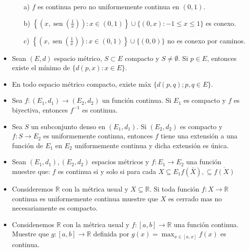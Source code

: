 \begin{itemize}
\begin{itemize}
    \item[a)] $f$ es continua pero no uniformemente continua en $(0,1)$.
    
    \item[b)] $\left\{\left(x, \operatorname{sen}\left(\frac{1}{x}\right)\right): x \in(0,1)\right\} \cup\{(0, x):-1 \leq x \leq 1\}$ es conexo.
    
    \item[c)] $\left\{\left(x, \operatorname{sen}\left(\frac{1}{x}\right)\right): x \in(0,1)\right\} \cup\{(0,0)\}$ no es conexo por caminos.

\end{itemize}

\item Sean $(E, d)$ espacio métrico, $S \subset E$ compacto y $S \neq \emptyset$. Si $p \in E$, entonces existe el mínimo de $\{d(p, x): x \in E\}$.

\item En todo espacio métrico compacto, existe máx $\{d(p, q) ; p, q \in E\}$.

\item Sea $f:\left(E_1, d_1\right) \rightarrow\left(E_2, d_2\right)$ un función continua. Si $E_1$ es compacto y $f$ es biyectiva, entonces $f^{-1}$ es continua.

\item Sea $S$ un subconjunto denso en $\left(E_1, d_1\right)$. Si $\left(E_2, d_2\right)$ es compacto y $f: S \rightarrow E_2$ es uniformemente continua, entonces $f$ tiene una extensión a una función de $E_1$ en $E_2$ uniformemente continua y dicha extensión es única.

\item Sean $\left(E_1, d_1\right),\left(E_2, d_2\right)$ espacios métricos y $f: E_1 \rightarrow E_2$ una función muestre que: $f$ es continua si y solo si para cada $X \subseteq E_1 f(\bar{X}), \subseteq \overline{f(X)}$

\item Consideremos $\mathbb{R}$ con la métrica usual y $X \subseteq \mathbb{R}$. Si toda función $f: X \rightarrow \mathbb{R}$ continua es uniformemente continua muestre que $X$ es cerrado mas no necesariamente es compacto.

\item Considenemos $\mathbb{R}$ con la métrica usual y $f:[a, b] \rightarrow \mathbb{R}$ una función continua. Muestre que $g:[a, b] \rightarrow \mathbb{R}$ definida por $g(x)=\max _{x \in[a, x]} f(x)$ es continua.


\end{itemize}
